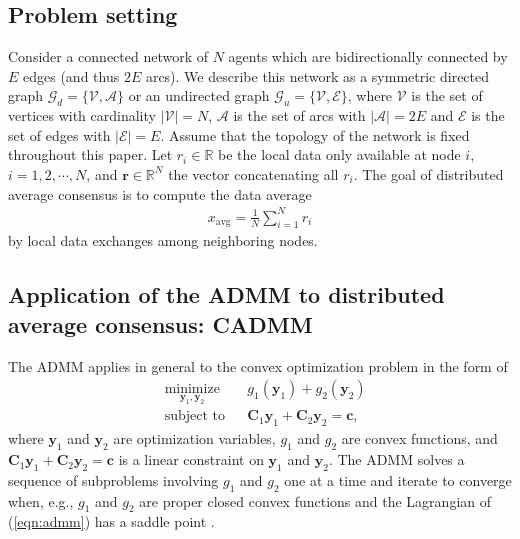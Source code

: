 \documentclass[journal]{IEEEtran}
\begin{document}
\subsection{Problem setting}
\label{sec:orgnotation}
Consider a connected network of $N$ agents which are bidirectionally connected by $E$ edges (and thus $2E$ arcs). We describe this network as a symmetric directed graph $\mathcal{G}_d=\{\mathcal{V},\mathcal{A}\}$ or an undirected graph $\mathcal{G}_u=\{\mathcal{V},\mathcal{E}\}$, where $\mathcal{V}$ is the set of vertices with cardinality $|\mathcal{V}|=N$, $\mathcal{A}$ is the set of arcs with $|\mathcal{A}|=2E$ and $\mathcal{E}$ is the set of edges with $|\mathcal{E}|=E$. Assume that the topology of the network is fixed throughout this paper. Let $r_i\in\mathbb{R}$ be the local data only available at node $i$, $i=1,2,\cdots,N$, and $\bm{r}\in\mathbb{R}^N$ the vector concatenating all $r_i$. The goal of distributed average consensus is to compute the data average  
\begin{equation}
\label{eqn:averageconsensus}
\begin{aligned}
x_\text{avg}=\frac{1}{N}\sum_{i=1}^N r_i
\end{aligned}
\end{equation} 
by local data exchanges among neighboring nodes.

\subsection{Application of the ADMM to distributed average consensus: CADMM}
The ADMM applies in general to the convex optimization problem in the form of 
\begin{equation}
\begin{aligned}
\label{eqn:admm}
& \underset{\bm y_1,\bm y_2}{\text{minimize}}
& & g_1(\bm y_1)+g_2(\bm y_2)\\
& \text{subject to}
& & \bm C_1\bm y_1+\bm C_2\bm y_2 = \bm c,
\end{aligned}
\end{equation}
where $\bm y_1$ and $\bm y_2$ are optimization variables, $g_1$ and $g_2$ are convex functions, and $\bm C_1\bm y_1+\bm C_2\bm y_2=\bm c$ is a linear constraint on $\bm y_1$ and $\bm y_2$. The ADMM solves a sequence of subproblems involving $g_1$ and $g_2$ one at a time and iterate to converge when, e.g., $g_1$ and $g_2$ are proper closed convex functions and the Lagrangian of (\ref{eqn:admm}) has a saddle point \cite{BoydADMM}. 
\end{document}
